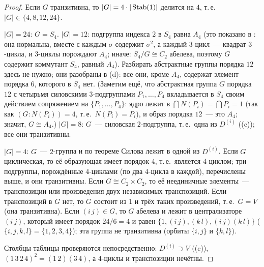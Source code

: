 \begin{proof}
Если $G$ транзитивна, то $|G|=4\cdot|\operatorname{Stab}(1)|$ делится на $4$, т.\,е.\ $|G|\in\{4,8,12,24\}$.

$|G|=24$: $G=S_4$. $|G|=12$: подгруппа индекса $2$ в $S_4$ равна $A_4$ (это показано в : она нормальна, вместе с
каждым $\sigma$ содержит $\sigma^2$, а каждый $3$-цикл~--- квадрат $3$-цикла, и $3$-циклы порождают $A_4$; иначе: $S_4/G\cong C_2$
абелева, поэтому $G$ содержит коммутант $S_4$, равный $A_4$). Разбирать абстрактные группы порядка $12$ здесь не нужно;
они разобраны в (d): все они, кроме $A_4$, содержат элемент порядка $6$, которого в $S_4$ нет. (Заметим ещё, что абстрактная группа $G$ порядка $12$ с четырьмя силовскими $3$-подгруппами
$P_1,\dots,P_4$ вкладывается в $S_4$ своим действием сопряжением на $\{P_1,\dots,P_4\}$: ядро лежит в $\bigcap N(P_i)=\bigcap P_i=1$
(так как $(G:N(P_i))=4$, т.\,е.\ $N(P_i)=P_i$), и образ порядка $12$~--- это $A_4$; значит, $G\cong A_4$.) $|G|=8$: $G$~---
силовская $2$-подгруппа, т.\,е.\ одна из $D^{(i)}$ ((c)); все они транзитивны.

$|G|=4$: $G$~--- $2$-группа и по теореме Силова лежит в одной из $D^{(i)}$. Если $G$ циклическая, то её образующая имеет
порядок $4$, т.\,е.\ является $4$-циклом; три подгруппы, порождённые $4$-циклами (по два $4$-цикла в каждой), перечислены
выше, и они транзитивны. Если $G\cong C_2\times C_2$, то её неединичные элементы~--- транспозиции или произведения двух
независимых транспозиций. Если транспозиций в $G$ нет, то $G$ состоит из $1$ и трёх таких произведений, т.\,е.\ $G=V$ (она
транзитивна). Если $(i\,j)\in G$, то $G$ абелева и лежит в централизаторе $(i\,j)$, который имеет порядок $24/6=4$ и равен
$\{1,(i\,j),(k\,l),(i\,j)(k\,l)\}$ ($\{i,j,k,l\}=\{1,2,3,4\}$); эта группа не транзитивна (орбиты $\{i,j\}$ и $\{k,l\}$).

Столбцы таблицы проверяются непосредственно: $D^{(i)}\supset V$ ((c)), $(1\,3\,2\,4)^2=(1\,2)(3\,4)$, а $4$-циклы и транспозиции
нечётны.
\end{proof}

